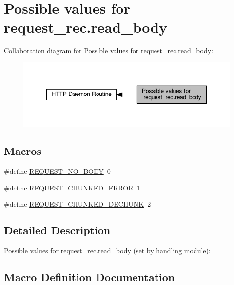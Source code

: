 \hypertarget{group__values__request__rec__body}{}\section{Possible values for request\+\_\+rec.\+read\+\_\+body}
\label{group__values__request__rec__body}
Collaboration diagram for Possible values for request\+\_\+rec.\+read\+\_\+body\+:
\nopagebreak
\begin{figure}[H]
\begin{center}
\leavevmode
\includegraphics[width=350pt]{group__values__request__rec__body}
\end{center}
\end{figure}
\subsection*{Macros}
\begin{DoxyCompactItemize}
\item 
\#define \hyperlink{group__values__request__rec__body_gaf74625e7d4f8f352ed14a4bdf3f7262b}{R\+E\+Q\+U\+E\+S\+T\+\_\+\+N\+O\+\_\+\+B\+O\+DY}~0
\item 
\#define \hyperlink{group__values__request__rec__body_ga49a17cc0a1f20af240d4e500b742d883}{R\+E\+Q\+U\+E\+S\+T\+\_\+\+C\+H\+U\+N\+K\+E\+D\+\_\+\+E\+R\+R\+OR}~1
\item 
\#define \hyperlink{group__values__request__rec__body_ga7f92a016589442201a742ebb637851b6}{R\+E\+Q\+U\+E\+S\+T\+\_\+\+C\+H\+U\+N\+K\+E\+D\+\_\+\+D\+E\+C\+H\+U\+NK}~2
\end{DoxyCompactItemize}


\subsection{Detailed Description}
Possible values for \hyperlink{structrequest__rec_a3e497fa2bdce1f63d6a4e896e8a0687e}{request\+\_\+rec.\+read\+\_\+body} (set by handling module)\+: 

\subsection{Macro Definition Documentation}
